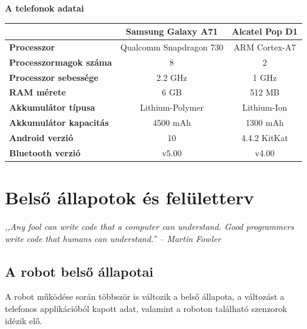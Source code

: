 \documentclass[]{thesis-ekf}
\theoremstyle{definition}
\begin{document}
\textbf{A telefonok adatai}
\begin{center}
	\begin{tabular}{|l|c|c|}
		\hline
		\multicolumn{1}{|c|}{\textbf{}}&\textbf{Samsung Galaxy A71}&\textbf{Alcatel Pop D1}\\
		\hline
		\textbf{Processzor}&Qualcomm Snapdragon 730&ARM Cortex-A7\\
		\hline
		\textbf{Processzormagok száma}&8&2\\
		\hline
		\textbf{Processzor sebessége}&2.2 GHz&1 GHz\\
		\hline
		\textbf{RAM mérete}&6 GB&512 MB\\
		\hline
		\textbf{Akkumulátor típusa}&Lithium-Polymer&Lithium-Ion\\
		\hline
		\textbf{Akkumulátor kapacitás}&4500 mAh&1300 mAh\\
		\hline
		\textbf{Android verzió}&10&4.4.2 KitKat\\
		\hline
		\textbf{Bluetooth verzió}&v5.00&v4.00\\
		\hline
	\end{tabular}
\end{center}
\chapter{Belső állapotok és felületterv}\label{fejezet_4}
\emph{,,Any fool can write code that a computer can understand. Good programmers write code that humans can understand.'' -- Martin Fowler}
\section{A robot belső állapotai}
A robot működése során többször is változik a belső állapota, a változást a telefonos applikációból kapott adat, valamint a roboton található szenzorok idézik elő.
\end{document}
